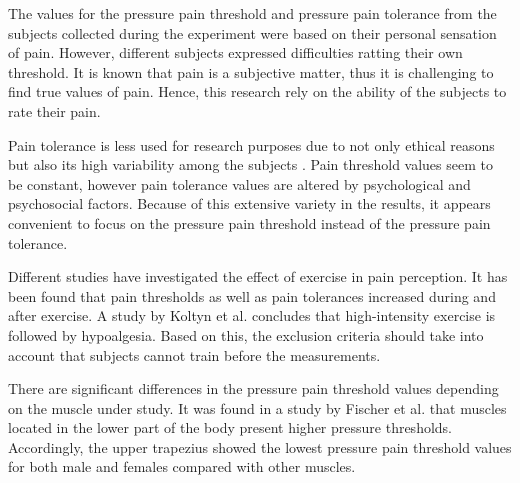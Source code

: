The values for the pressure pain threshold and pressure pain tolerance from the subjects collected during the experiment were based on their personal sensation of pain. However, different subjects expressed difficulties ratting their own threshold. It is known that pain is a subjective matter, thus it is challenging to find true values of pain. Hence, this research rely on the ability of the subjects to rate their pain.

Pain tolerance is less used for research purposes due to not only  ethical reasons but also its high variability among the subjects \cite{Yarnitsky2006}. Pain threshold values seem to be constant, however pain tolerance values are altered by psychological and psychosocial factors. Because of this extensive variety in the results, it appears convenient to focus on the pressure pain threshold instead of the pressure pain tolerance. 

Different studies have investigated the effect of exercise in pain perception. It has been found that pain thresholds as well as pain tolerances increased during and after exercise.  A study by Koltyn et al. \cite{Koltyn2002} concludes that high-intensity exercise is followed by hypoalgesia. Based on this, the exclusion criteria should take into account that subjects cannot train before the measurements.

There are significant differences in the pressure pain threshold values depending on the  muscle under study. It was found in a study by Fischer et al. \cite{Fischer1987} that muscles located in the lower part of the body present  higher pressure thresholds. Accordingly, the upper trapezius showed the lowest pressure pain threshold values for both male and females compared with other muscles.

